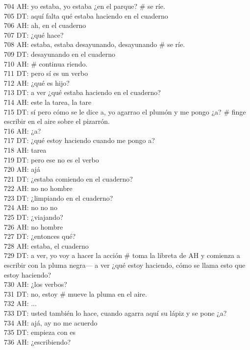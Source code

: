 704 AH: yo estaba, yo estaba ¿en el parque? \# se ríe.\\
705 DT: aquí falta qué estaba haciendo en el cuaderno\\
706 AH: ah, en el cuaderno\\
707 DT: ¿qué hace?\\
708 AH: estaba, estaba desayunando, desayunando \# se ríe.\\
709 DT: desayunando en el cuaderno\\
710 AH: \# continua riendo.\\
711 DT: pero sí es un verbo\\
712 AH: ¿qué es hijo?\\
713 DT: a ver ¿qué estaba haciendo en el cuaderno?\\
714 AH: este la tarea, la tare\\
715 DT: sí pero cómo se le dice a, yo agarrao el plumón y me pongo ¿a? \# finge escribir en el aire sobre el pizarrón.\\
716 AH: ¿a?\\
717 DT: ¿qué estoy haciendo cuando me pongo a?\\
718 AH: tarea\\
719 DT: pero ese no es el verbo\\
720 AH: ajá\\
721 DT: ¿estaba comiendo en el cuaderno?\\
722 AH: no no hombre\\
723 DT: ¿limpiando en el cuaderno?\\
724 AH: no no no\\
725 DT: ¿viajando?\\
726 AH: no hombre\\
727 DT: ¿entonces qué?\\
728 AH: estaba, el cuaderno\\
729 DT: a ver, yo voy a hacer la acción \# toma la libreta de AH y comienza a escribir con la pluma negra--- a ver ¿qué estoy haciendo, cómo se llama esto que estoy haciendo?\\
730 AH: ¿los verbos?\\
731 DT: no, estoy \# mueve la pluma en el aire.\\
732 AH: ...\\
733 DT: usted también lo hace, cuando agarra aquí su lápiz y se pone ¿a?\\
734 AH: ajá, ay no me acuerdo\\
735 DT: empieza con es\\
736 AH: ¿escribiendo?\\
